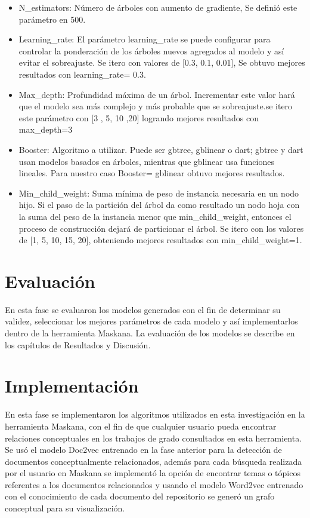 \begin{itemize}
	\item N\_estimators: Número de árboles con aumento de gradiente, Se definió este parámetro en 500.
	\item Learning\_rate: El parámetro learning\_rate se puede configurar para controlar la ponderación de los árboles nuevos agregados al modelo y así evitar el sobreajuste. Se itero con valores de [0.3, 0.1,  0.01], Se obtuvo  mejores resultados con learning\_rate= 0.3.
	\item Max\_depth: Profundidad máxima de un árbol. Incrementar este valor hará que el modelo sea más complejo y más probable que se sobreajuste.se itero este parámetro con [3 , 5, 10 ,20] logrando mejores resultados con  max\_depth=3
	\item Booster: Algoritmo a utilizar. Puede ser gbtree, gblinear o dart; gbtree y dart usan modelos basados en árboles, mientras que gblinear usa funciones lineales. Para nuestro caso Booster= gblinear obtuvo mejores resultados.
	\item Min\_child\_weight: Suma mínima de peso de instancia necesaria en un nodo hijo. Si el paso de la partición del árbol da como resultado un nodo hoja con la suma del peso de la instancia menor que min\_child\_weight, entonces el proceso de construcción dejará de particionar el árbol. Se itero con los valores de [1, 5, 10, 15, 20], obteniendo mejores resultados con min\_child\_weight=1. 
\end{itemize}

\section{Evaluación}

En esta fase se evaluaron los modelos generados con el fin de determinar su validez, seleccionar los mejores parámetros de cada modelo y así implementarlos dentro de la herramienta Maskana.  La evaluación de los modelos se describe en los capítulos de Resultados y Discusión.



\section{Implementación}

En esta fase se implementaron los algoritmos utilizados en esta investigación en la herramienta Maskana, con el fin de que cualquier usuario pueda encontrar relaciones conceptuales en los trabajos de grado consultados en esta herramienta.
Se usó el modelo Doc2vec entrenado en la fase anterior para la detección de documentos conceptualmente relacionados, además para cada búsqueda realizada por el usuario en Maskana se implementó la opción de encontrar temas o tópicos referentes a los documentos relacionados y usando el modelo Word2vec entrenado con el conocimiento de cada documento del repositorio se generó un grafo conceptual para su visualización. 

